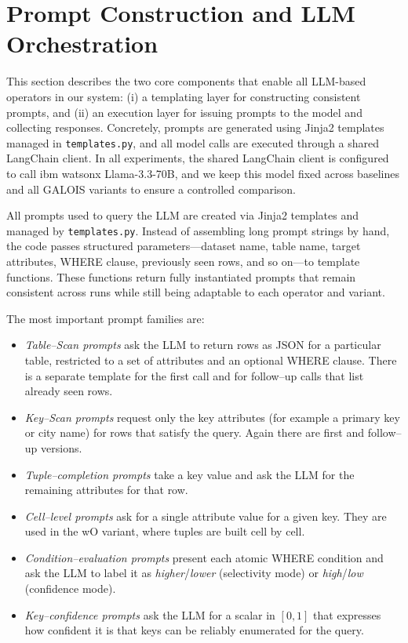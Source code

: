 \documentclass[11pt]{article}
\begin{document}
\clearpage
\section{Prompt Construction and LLM Orchestration}
\label{sec:prompt_orchestration}

This section describes the two core components that enable all LLM-based operators in our system: (i) a templating layer for constructing consistent prompts, and (ii) an execution layer for issuing prompts to the model and collecting responses. Concretely, prompts are generated using Jinja2 templates managed in \texttt{templates.py}, and all model calls are executed through a shared LangChain client. In all experiments, the shared LangChain client is configured to call ibm watsonx Llama-3.3-70B, and we keep this model fixed across baselines and all GALOIS variants to ensure a controlled comparison.

All prompts used to query the LLM are created via Jinja2 templates and managed by \texttt{templates.py}. Instead of assembling long prompt strings by hand, the code passes structured parameters---dataset name, table name, target attributes, WHERE clause, previously seen rows, and so on---to template functions. These functions return fully instantiated prompts that remain consistent across runs while still being adaptable to each operator and variant.

The most important prompt families are:

\begin{itemize}
  \item \emph{Table--Scan prompts} ask the LLM to return rows as JSON for a particular table, restricted to a set of attributes and an optional WHERE clause. There is a separate template for the first call and for follow--up calls that list already seen rows.
  \item \emph{Key--Scan prompts} request only the key attributes (for example a primary key or city name) for rows that satisfy the query. Again there are first and follow--up versions.
  \item \emph{Tuple--completion prompts} take a key value and ask the LLM for the remaining attributes for that row.
  \item \emph{Cell--level prompts} ask for a single attribute value for a given key. They are used in the wO variant, where tuples are built cell by cell.
  \item \emph{Condition--evaluation prompts} present each atomic WHERE condition and ask the LLM to label it as \emph{higher}/\emph{lower} (selectivity mode) or \emph{high}/\emph{low} (confidence mode).
  \item \emph{Key--confidence prompts} ask the LLM for a scalar in $[0,1]$ that expresses how confident it is that keys can be reliably enumerated for the query.
\end{itemize}
\end{document}

